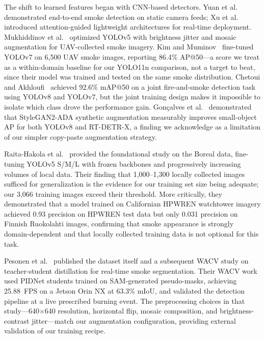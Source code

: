 \documentclass[10pt,twocolumn]{article}
\begin{document}
The shift to learned features began with CNN-based detectors. Yuan et al.~\cite{yuan2019deepsmoke} demonstrated end-to-end smoke detection on static camera feeds; Xu et al.~\cite{xu2021attention} introduced attention-guided lightweight architectures for real-time deployment. Mukhiddinov et al.~\cite{mukhiddinov2022wildfire} optimized YOLOv5 with brightness jitter and mosaic augmentation for UAV-collected smoke imagery. Kim and Muminov~\cite{kim2023forest} fine-tuned YOLOv7 on 6,500 UAV smoke images, reporting 86.4\% AP@50---a score we treat as a within-domain baseline for our YOLO11n comparison, not a target to beat, since their model was trained and tested on the same smoke distribution. Chetoui and Akhloufi~\cite{chetoui2024fire} achieved 92.6\% mAP@50 on a joint fire-and-smoke detection task using YOLOv8 and YOLOv7, but the joint training design makes it impossible to isolate which class drove the performance gain. Gon{\c{c}}alves et al.~\cite{goncalves2024wildfire} demonstrated that StyleGAN2-ADA synthetic augmentation measurably improves small-object AP for both YOLOv8 and RT-DETR-X, a finding we acknowledge as a limitation of our simpler copy-paste augmentation strategy.

Raita-Hakola et al.~\cite{raita2023combining} provided the foundational study on the Boreal data, fine-tuning YOLOv5 S/M/L with frozen backbones and progressively increasing volumes of local data. Their finding that 1,000--1,300 locally collected images sufficed for generalization is the evidence for our training set size being adequate; our 3,066 training images exceed their threshold. More critically, they demonstrated that a model trained on Californian HPWREN watchtower imagery achieved 0.93 precision on HPWREN test data but only 0.031 precision on Finnish Ruokolahti images, confirming that smoke appearance is strongly domain-dependent and that locally collected training data is not optional for this task.

Pesonen et al.~\cite{pesonen2025boreal,pesonen2025detecting} published the dataset itself and a subsequent WACV study on teacher-student distillation for real-time smoke segmentation. Their WACV work used PIDNet students trained on SAM-generated pseudo-masks, achieving 25.88~FPS on a Jetson Orin NX at 63.3\% mIoU, and validated the detection pipeline at a live prescribed burning event. The preprocessing choices in that study---640\(\times\)640 resolution, horizontal flip, mosaic composition, and brightness-contrast jitter---match our augmentation configuration, providing external validation of our training recipe.
\end{document}
